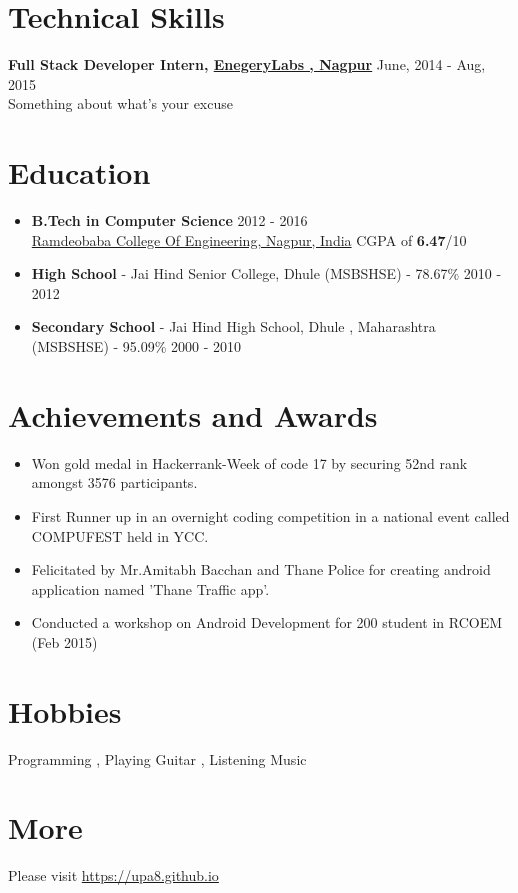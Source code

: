 \documentclass[margin, centered]{res}
\begin{document}
\begin{resume}
\section{Technical Skills}
\textbf{Full Stack Developer Intern, \href{http://www.energylabs.in/}{EnegeryLabs , Nagpur}}
 \hfill June, 2014 - Aug, 2015 \\ 
Something about what's your excuse
\\


\section{Education}
\begin{itemize}[leftmargin=*]\item
\textbf{B.Tech in Computer Science} \hfill 2012 - 2016 \\
\href{http://rknec.edu}{Ramdeobaba College Of Engineering, Nagpur, India}
  CGPA of \textbf{6.47}/10
\item\textbf{High School} - {Jai Hind Senior College, Dhule} (MSBSHSE) - 78.67\% \hfill 2010 - 2012 \
\item\textbf{Secondary School} - Jai Hind High School, Dhule , Maharashtra (MSBSHSE) - 95.09\% \hfill 2000 - 2010
\end{itemize}

\section{Achievements and Awards}
\begin{itemize}[leftmargin=*]
 \item Won gold medal in Hackerrank-Week of code 17 by securing 52nd rank amongst 3576 participants. 
 \item First Runner up in an overnight coding competition in a national event called COMPUFEST held in YCC.
 \item Felicitated by Mr.Amitabh Bacchan and Thane Police for creating android application named 'Thane Traffic 
app'.
\item 
 Conducted a workshop on Android Development for 200 student in RCOEM (Feb 2015)
\end{itemize}


\section{Hobbies}
Programming , Playing Guitar , Listening Music 
\section{More}
Please visit \href{https://upa8.github.io}{https://upa8.github.io}
\end{resume}
\end{document}
